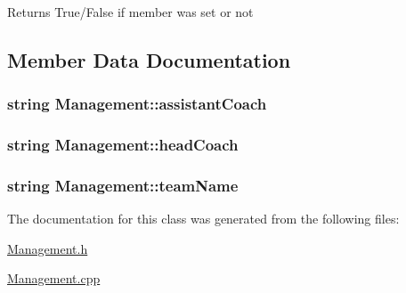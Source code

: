 \begin{DoxyReturn}{Returns}
True/\-False if member was set or not 
\end{DoxyReturn}


\subsection{Member Data Documentation}
\hypertarget{class_management_a0255211caa5f03eaf86491d069e36921}{
\subsubsection[{assistant\-Coach}]{\setlength{\rightskip}{0pt plus 5cm}string Management\-::assistant\-Coach\hspace{0.3cm}{\ttfamily [private]}}}\label{class_management_a0255211caa5f03eaf86491d069e36921}
\hypertarget{class_management_aaec7a4d4d85085cc58237f23b29648bc}{
\subsubsection[{head\-Coach}]{\setlength{\rightskip}{0pt plus 5cm}string Management\-::head\-Coach\hspace{0.3cm}{\ttfamily [private]}}}\label{class_management_aaec7a4d4d85085cc58237f23b29648bc}
\hypertarget{class_management_a78344be52d9cb5025226b4939e562901}{
\subsubsection[{team\-Name}]{\setlength{\rightskip}{0pt plus 5cm}string Management\-::team\-Name\hspace{0.3cm}{\ttfamily [private]}}}\label{class_management_a78344be52d9cb5025226b4939e562901}


The documentation for this class was generated from the following files\-:\begin{DoxyCompactItemize}
\item 
\hyperlink{_management_8h}{Management.\-h}\item 
\hyperlink{_management_8cpp}{Management.\-cpp}\end{DoxyCompactItemize}
